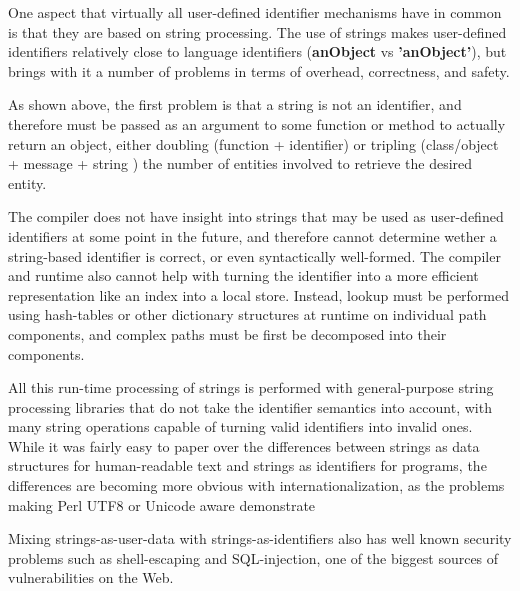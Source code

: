 \documentclass[preprint,authoryear]{acm_proc_article-sp}
\begin{document}
One aspect that virtually all user-defined identifier mechanisms have in common is that they
are based on string processing.  The use of strings makes user-defined identifiers relatively
close to language identifiers ({\bf \hbox{anObject}} vs {\bf \hbox{'anObject'}}), but brings with it a number of problems in terms of overhead, correctness, and safety.

As shown above, the first problem is that a string is not an identifier, and therefore
must be passed as an argument to some function or method to actually return
 an object, either doubling (function + identifier) or tripling (class/object + message + string ) the number of entities involved to retrieve the desired entity.  

The compiler does not have insight into strings that may be used as user-defined 
identifiers at some point in the future, and therefore cannot determine wether 
a string-based identifier is correct, or even syntactically well-formed.   The compiler
and runtime also cannot help with turning the identifier into a more efficient representation
like an index into a local store.  Instead, lookup must be performed using hash-tables
or other dictionary structures at runtime on individual path components, 
and complex paths must be first be decomposed into their components.

All this run-time processing of strings is performed with general-purpose string
processing libraries that do not take the identifier semantics into account, with
many string operations capable of turning valid identifiers into invalid ones.
While it was fairly easy to paper over the differences between strings as 
data structures for human-readable text and strings as identifiers for programs,
the differences are becoming more obvious with internationalization, as the
problems making Perl UTF8 or Unicode aware demonstrate \cite{perl-unicode}

Mixing strings-as-user-data with strings-as-identifiers also has well known
security problems such as shell-escaping and SQL-injection, one of the
biggest sources of vulnerabilities on the Web.

\end{document}
